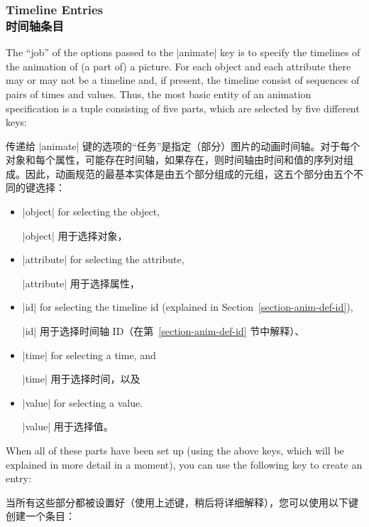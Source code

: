 \subsubsection{Timeline Entries\\时间轴条目}

The ``job'' of the options passed to the |animate| key is to specify the
timelines of the animation of (a part of) a picture. For each object and each
attribute there may or may not be a timeline and, if present, the timeline
consist of sequences of pairs of times and values. Thus, the most basic entity
of an animation specification is a tuple consisting of five parts, which are
selected by five different keys:

传递给 |animate| 键的选项的“任务”是指定（部分）图片的动画时间轴。对于每个对象和每个属性，可能存在时间轴，如果存在，则时间轴由时间和值的序列对组成。因此，动画规范的最基本实体是由五个部分组成的元组，这五个部分由五个不同的键选择：


\begin{itemize}
    \item |object| for selecting the object,

    |object| 用于选择对象，


    \item |attribute| for selecting the attribute,

    |attribute| 用于选择属性，


    \item |id| for selecting the timeline id (explained in
        Section~\ref{section-anim-def-id}),

        |id| 用于选择时间轴 ID（在第~\ref{section-anim-def-id} 节中解释）、


    \item |time| for selecting a time, and

    |time| 用于选择时间，以及


    \item |value| for selecting a value.

    |value| 用于选择值。


\end{itemize}
%
When all of these parts have been set up (using the above keys, which will be
explained in more detail in a moment), you can use the following key to create
an entry:

当所有这些部分都被设置好（使用上述键，稍后将详细解释），您可以使用以下键创建一个条目：

